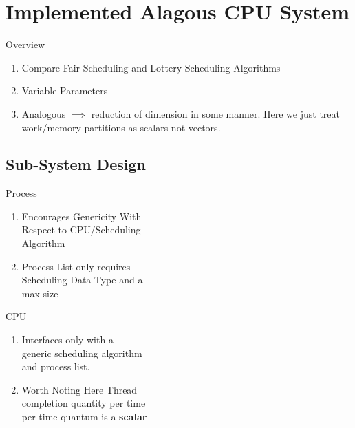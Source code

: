 \documentclass{beamer}
\begin{document}
\section{Implemented Alagous CPU System}
  \begin{frame}{Overview}
    \begin{enumerate}
      \item Compare Fair Scheduling and Lottery Scheduling Algorithms
      \item Variable Parameters
      \item Analogous $\implies$ reduction of dimension in some manner.  Here we
        just treat work/memory partitions as scalars not vectors.
    \end{enumerate}
  \end{frame}

  \subsection{Sub-System Design}
    \begin{frame}{Process}
      \begin{enumerate}
        \item Encourages Genericity With \\
          Respect to CPU/Scheduling \\
          Algorithm
        \item Process List only requires \\
          Scheduling Data Type and a \\
          max size
      \end{enumerate}
      \begin{textblock*}{2.5cm}(7cm,2.2cm)
        \texttt{[image: \{./figures/process\_subsystem.png]}}
      \end{textblock*}
    \end{frame}

    \begin{frame}{CPU}
      \begin{enumerate}
        \item Interfaces only with a \\
          generic scheduling algorithm \\
          and process list.
        \item Worth Noting Here Thread \\
          completion quantity per time \\
          per time quantum is a \textbf{scalar}
      \end{enumerate}
      \begin{textblock*}{2.5cm}(7cm,2.2cm)
        \texttt{[image: \{./figures/cpu\_subsystem.png]}}
      \end{textblock*}
    \end{frame}
\end{document}
